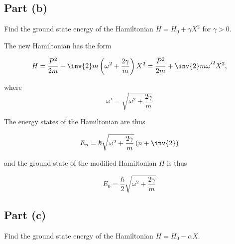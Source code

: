 \subsection{Part (b)}

Find the ground state energy of the Hamiltonian $H = H_0 + \gamma X^2$ for $\gamma > 0$.

The new Hamiltonian has the form

\begin{equation}\label{eqn:phy456ps1:520}
H = \frac{P^2}{2m} + \inv{2} m \left(\omega^2 + \frac{2 \gamma}{m} \right) X^2 = 
\frac{P^2}{2m} + \inv{2} m {\omega'}^2 X^2,
\end{equation}

where
\begin{equation}\label{eqn:phy456ps1:540}
\omega' = \sqrt{ \omega^2 + \frac{2 \gamma}{m} }
\end{equation}

The energy states of the Hamiltonian are thus

\begin{equation}\label{eqn:phy456ps1:560}
E_n = \hbar \sqrt{ \omega^2 + \frac{2 \gamma}{m} } \left( n + \inv{2} \right)
\end{equation}

and the ground state of the modified Hamiltonian $H$ is thus

\begin{equation}\label{eqn:phy456ps1:580}
E_0 = \frac{\hbar}{2} \sqrt{ \omega^2 + \frac{2 \gamma}{m} } 
\end{equation}

\subsection{Part (c)}

Find the ground state energy of the Hamiltonian $H = H_0 - \alpha X$.

\EndArticle
